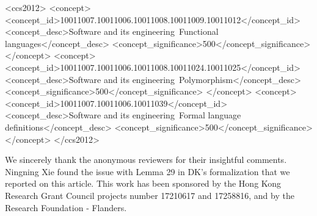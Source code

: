 \documentclass[acmsmall,screen]{acmart}
\begin{document}
\begin{CCSXML}
<ccs2012>
<concept>
<concept_id>10011007.10011006.10011008.10011009.10011012</concept_id>
<concept_desc>Software and its engineering~Functional languages</concept_desc>
<concept_significance>500</concept_significance>
</concept>
<concept>
<concept_id>10011007.10011006.10011008.10011024.10011025</concept_id>
<concept_desc>Software and its engineering~Polymorphism</concept_desc>
<concept_significance>500</concept_significance>
</concept>
<concept>
<concept_id>10011007.10011006.10011039</concept_id>
<concept_desc>Software and its engineering~Formal language definitions</concept_desc>
<concept_significance>500</concept_significance>
</concept>
</ccs2012>
\end{CCSXML}





\maketitle



%







\newpage
\appendix


\newpage
\begin{acks}                            %

We sincerely thank the anonymous reviewers for their insightful
comments. Ningning Xie found the issue with Lemma 29 in DK's formalization that we reported 
on this article. This work has been sponsored by the Hong Kong Research
Grant Council projects number 17210617 and 17258816, and by the
Research Foundation - Flanders.
\end{acks}



\end{document}
